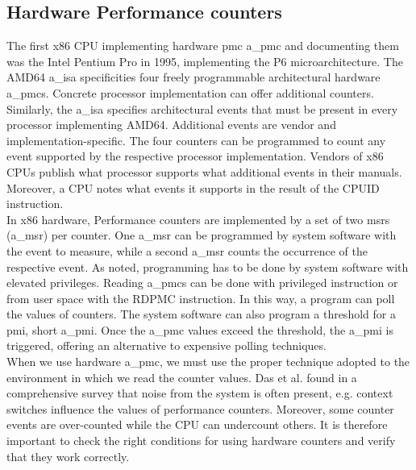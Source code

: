 \subsection{Hardware Performance counters}
\label{sec:state:technical:hpc}
The first x86 CPU implementing hardware \gls{pmc} \acrshort{a_pmc} and
documenting them was the Intel Pentium Pro in 1995, implementing the P6
microarchitecture.\cite{intel_sdm} The AMD64 \acrshort{a_isa} specificities four
freely programmable architectural hardware \acrshort{a_pmc}s.\cite{amd_manual}
Concrete processor implementation can offer additional counters. Similarly, the
\acrshort{a_isa} specifies architectural events that must be present in every
processor implementing AMD64. Additional events are vendor and
implementation-specific. The four counters can be programmed to count any event
supported by the respective processor implementation. Vendors of x86 CPUs
publish what processor supports what additional events in their manuals.
Moreover, a CPU notes what events it supports in the result of the \gls{CPUID}
instruction. \\

In x86 hardware, Performance counters are implemented by a set of two \gls{msr}s
(\acrshort{a_msr}) per counter. One \acrshort{a_msr} can be programmed by system
software with the event to measure, while a second \acrshort{a_msr} counts the
occurrence of
the respective event. As noted, programming has to be done by system software
with elevated privileges. Reading \acrlong{a_pmc}s can be done
with privileged instruction or from user space with the RDPMC instruction.
In this way, a program can poll the values of counters. The system software
can also program a threshold for a \gls{pmi}, short \acrshort{a_pmi}.
Once the \acrshort{a_pmc} values exceed the threshold, the \acrshort{a_pmi} is
triggered, offering an alternative to expensive polling techniques.\\

When we use hardware \acrshort{a_pmc}, we must use the proper
technique adopted to the environment in which we read the counter values. Das et
al. found in a comprehensive survey that noise from the system is often present,
e.g. context switches influence the values of performance counters.
\cite{das_sok_2019} Moreover, some counter events are over-counted while the CPU
can undercount others.\cite{weaver_non-determinism_2013} It is therefore
important to check the right conditions for using hardware counters and verify
that they work correctly.

